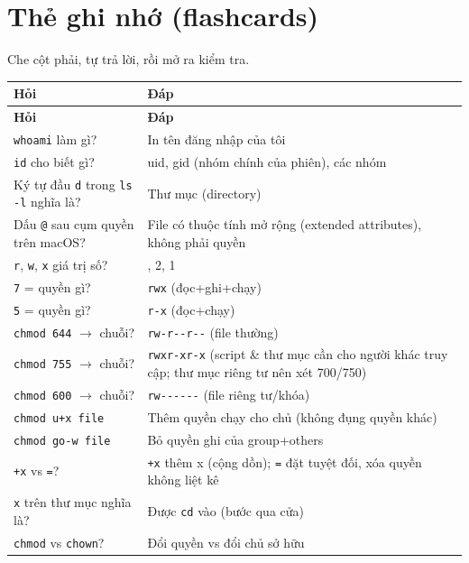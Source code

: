 \documentclass[12pt,a4paper]{article}
\newcommand{\cmd}[1]{\texttt{#1}}
\begin{document}
\section{Thẻ ghi nhớ (flashcards)}

\begin{notebox}
Che cột phải, tự trả lời, rồi mở ra kiểm tra.
\end{notebox}

\begin{longtable}{|>{\raggedright\arraybackslash}p{6cm}|>{\raggedright\arraybackslash}p{7.5cm}|}
\hline
\rowcolor{tablehead}\textbf{Hỏi} & \textbf{Đáp} \\
\hline
\endfirsthead
\hline
\rowcolor{tablehead}\textbf{Hỏi} & \textbf{Đáp} \\
\hline
\endhead
\cmd{whoami} làm gì? & In tên đăng nhập của tôi \\
\hline
\cmd{id} cho biết gì? & uid, gid (nhóm chính của phiên), các nhóm \\
\hline
Ký tự đầu \cmd{d} trong \cmd{ls -l} nghĩa là? & Thư mục (directory) \\
\hline
Dấu \cmd{@} sau cụm quyền trên macOS? & File có thuộc tính mở rộng (extended
attributes), không phải quyền \\
\hline
\cmd{r}, \cmd{w}, \cmd{x} giá trị số? & 4, 2, 1 \\
\hline
\cmd{7} = quyền gì? & \cmd{rwx} (đọc+ghi+chạy) \\
\hline
\cmd{5} = quyền gì? & \cmd{r-x} (đọc+chạy) \\
\hline
\cmd{chmod 644} $\rightarrow$ chuỗi? & \cmd{rw-r-{}-r-{}-} (file thường) \\
\hline
\cmd{chmod 755} $\rightarrow$ chuỗi? & \cmd{rwxr-xr-x} (script \& thư mục cần cho người khác truy
cập; thư mục riêng tư nên xét 700/750) \\
\hline
\cmd{chmod 600} $\rightarrow$ chuỗi? & \cmd{rw-{}-{}-{}-{}-{}-} (file riêng tư/khóa) \\
\hline
\cmd{chmod u+x file} & Thêm quyền chạy cho chủ (không đụng quyền khác) \\
\hline
\cmd{chmod go-w file} & Bỏ quyền ghi của group+others \\
\hline
\cmd{+x} vs \cmd{=}? & \cmd{+x} thêm x (cộng dồn); \cmd{=} đặt tuyệt đối, xóa quyền
không liệt kê \\
\hline
\cmd{x} trên thư mục nghĩa là? & Được \cmd{cd} vào (bước qua cửa) \\
\hline
\cmd{chmod} vs \cmd{chown}? & Đổi quyền vs đổi chủ sở hữu \\

\end{longtable}
\end{document}
